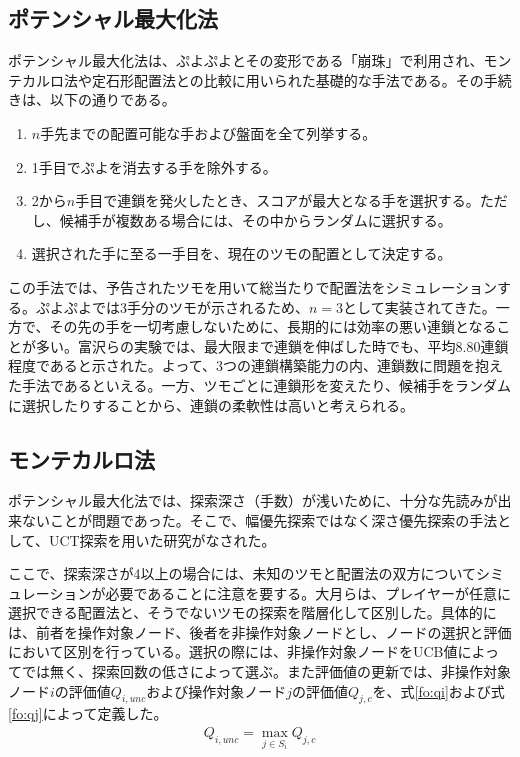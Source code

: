 \documentclass[12pt]{jreport}
\begin{document}
\subsection{ポテンシャル最大化法}
ポテンシャル最大化法は、ぷよぷよとその変形である「崩珠」で利用され、モンテカルロ法や定石形配置法との比較に用いられた基礎的な手法である\cite{puyo_monte, puyo_temp}。その手続きは、以下の通りである。
\begin{enumerate}
\item $n$手先までの配置可能な手および盤面を全て列挙する。
\item 1手目でぷよを消去する手を除外する。
\item 2から$n$手目で連鎖を発火したとき、スコアが最大となる手を選択する。ただし、候補手が複数ある場合には、その中からランダムに選択する。
\item 選択された手に至る一手目を、現在のツモの配置として決定する。
\end{enumerate}

この手法では、予告されたツモを用いて総当たりで配置法をシミュレーションする。ぷよぷよでは3手分のツモが示されるため、$n=3$として実装されてきた。一方で、その先の手を一切考慮しないために、長期的には効率の悪い連鎖となることが多い。富沢ら\cite{puyo_temp}の実験では、最大限まで連鎖を伸ばした時でも、平均8.80連鎖程度であると示された。よって、3つの連鎖構築能力の内、連鎖数に問題を抱えた手法であるといえる。一方、ツモごとに連鎖形を変えたり、候補手をランダムに選択したりすることから、連鎖の柔軟性は高いと考えられる。

\subsection{モンテカルロ法}
ポテンシャル最大化法では、探索深さ（手数）が浅いために、十分な先読みが出来ないことが問題であった。そこで、幅優先探索ではなく深さ優先探索の手法として、UCT探索を用いた研究がなされた\cite{puyo_monte}。

ここで、探索深さが4以上の場合には、未知のツモと配置法の双方についてシミュレーションが必要であることに注意を要する。大月ら\cite{puyo_monte}は、プレイヤーが任意に選択できる配置法と、そうでないツモの探索を階層化して区別した。具体的には、前者を操作対象ノード、後者を非操作対象ノードとし、ノードの選択と評価において区別を行っている。選択の際には、非操作対象ノードをUCB値によってでは無く、探索回数の低さによって選ぶ。また評価値の更新では、非操作対象ノード$i$の評価値$Q_{i,unc}$および操作対象ノード$j$の評価値$Q_{j,c}$を、式\ref{fo:qi}および式\ref{fo:qj}によって定義した。
\begin{eqnarray} \label{fo:qi}
  Q_{i,unc} = \max_{j\in S_i}Q_{j,c}
\end{eqnarray}
\end{document}
